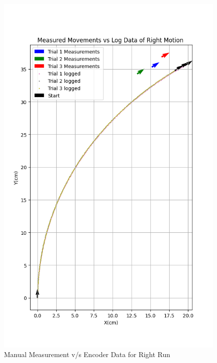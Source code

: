 {        \begin{figure}[!ht] 
            \centering \includegraphics[scale=.60]{"images/experiment_2/Figure_right.png"}
            \caption{Manual Measurement v/s Encoder Data for Right Run}
            \label{fig:right-manual-encoder}
        \end{figure}
        
}
